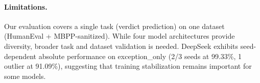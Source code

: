 \documentclass[11pt]{article}
\begin{document}
\paragraph{Limitations.} Our evaluation covers a single task (verdict prediction) on one dataset (HumanEval + MBPP-sanitized). While four model architectures provide diversity, broader task and dataset validation is needed. DeepSeek exhibits seed-dependent absolute performance on exception\_only (2/3 seeds at 99.33\%, 1 outlier at 91.09\%), suggesting that training stabilization remains important for some models.
\end{document}
